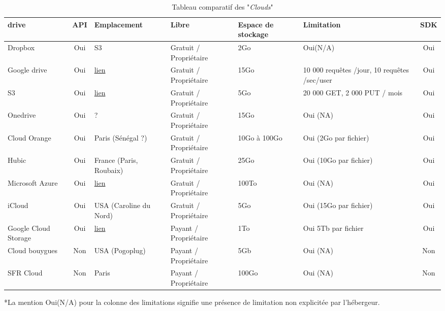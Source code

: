 \documentclass[10pt]{article}
\begin{document}
\begin{table}[!h]
\caption{Tableau comparatif des "\textit{Clouds}"}
\renewcommand{\arraystretch}{1.5}
\begin{center}
\begin{tabular}{|m{1in}|c|m{1in}|m{1in}|m{1in}|m{1in}|c|}
 \hline
 \bf\centering drive & \bf API & \bf Emplacement & \bf Libre & \bf\centering Espace de stockage & \bf Limitation & \bf SDK\\
 \hline
 \centering Dropbox & Oui & S3 & Gratuit / Propriétaire & 2Go & Oui(N/A) & Oui \\
 \hline
  \centering Google drive & Oui  & \href{http://www.google.com/about/datacenters/inside/locations/index.html}{lien} & Gratuit / Propriétaire & 15Go & 10 000 requêtes /jour, 10 requêtes /sec/user & Oui \\
 \hline
  \centering S3 & Oui  &  \href{http://aws.amazon.com/fr/about-aws/global-infrastructure/}{lien} & Gratuit / Propriétaire & 5Go & 20 000 GET, 2 000 PUT / mois & Oui \\
 \hline
  \centering Onedrive & Oui  & ? & Gratuit / Propriétaire & 15Go & Oui (NA) & Oui \\
 \hline
  \centering Cloud Orange & Oui  & Paris (Sénégal ?) & Gratuit / Propriétaire & 10Go à 100Go & Oui (2Go par fichier) & Oui \\
 \hline
  \centering Hubic & Oui  & France (Paris, Roubaix) & Gratuit / Propriétaire & 25Go & Oui (10Go par fichier) & Oui \\
 \hline
  \centering Microsoft Azure & Oui  &  \href{http://azure.microsoft.com/en-us/regions/}{lien} & Gratuit / Propriétaire & 100To & Oui (NA) & Oui \\
 \hline
  \centering iCloud & Oui  & USA (Caroline du Nord) & Gratuit / Propriétaire & 5Go & Oui (15Go par fichier) & Oui \\
 \hline
  \centering Google Cloud Storage & Oui  &  \href{http://www.google.com/about/datacenters/inside/locations/index.html}{lien}  & Payant  / Propriétaire & 1To & Oui 5Tb par fichier & Oui \\
 \hline
  \centering Cloud bouygues & Non  & USA (Pogoplug) & Payant  / Propriétaire & 5Gb & Oui (NA) & Non \\
 \hline
  \centering SFR Cloud & Non & Paris & Payant / Propriétaire & 100Go & Oui (NA) & Non \\
 \hline
\end{tabular}
\end{center}
\end{table}
*La mention Oui(N/A) pour la colonne des limitations signifie une présence de limitation non explicitée par l'hébergeur.\\
\end{document}
